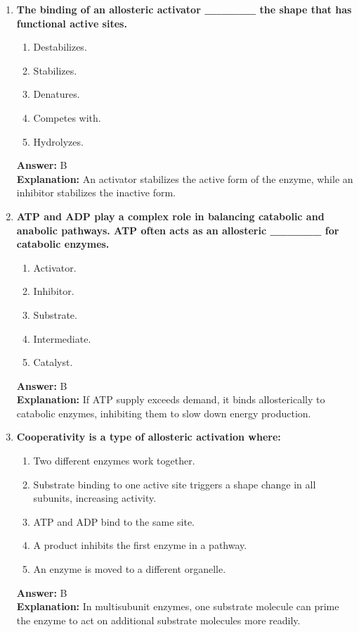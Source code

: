 \documentclass[11pt, a4paper]{article}
\begin{document}
\begin{enumerate}[leftmargin=*, label=\arabic*.]
\item \textbf{The binding of an allosteric activator \_\_\_\_\_\_ the shape that has functional active sites.}
\begin{enumerate}[label=\Alph*.]
    \item Destabilizes.
    \item Stabilizes.
    \item Denatures.
    \item Competes with.
    \item Hydrolyzes.
\end{enumerate}
\textbf{Answer:} B \\
\textbf{Explanation:} An activator stabilizes the active form of the enzyme, while an inhibitor stabilizes the inactive form.

\item \textbf{ATP and ADP play a complex role in balancing catabolic and anabolic pathways. ATP often acts as an allosteric \_\_\_\_\_\_ for catabolic enzymes.}
\begin{enumerate}[label=\Alph*.]
    \item Activator.
    \item Inhibitor.
    \item Substrate.
    \item Intermediate.
    \item Catalyst.
\end{enumerate}
\textbf{Answer:} B \\
\textbf{Explanation:} If ATP supply exceeds demand, it binds allosterically to catabolic enzymes, inhibiting them to slow down energy production.

\item \textbf{Cooperativity is a type of allosteric activation where:}
\begin{enumerate}[label=\Alph*.]
    \item Two different enzymes work together.
    \item Substrate binding to one active site triggers a shape change in all subunits, increasing activity.
    \item ATP and ADP bind to the same site.
    \item A product inhibits the first enzyme in a pathway.
    \item An enzyme is moved to a different organelle.
\end{enumerate}
\textbf{Answer:} B \\
\textbf{Explanation:} In multisubunit enzymes, one substrate molecule can prime the enzyme to act on additional substrate molecules more readily.


\end{enumerate}
\end{document}
